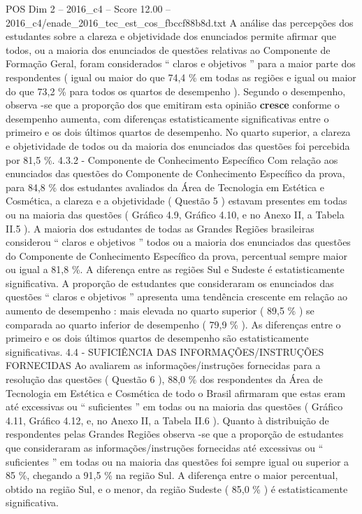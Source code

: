 \begin{textsample}{POS Dim 2 – 2016\_c4 – Score 12.00 – 2016\_c4/enade\_2016\_tec\_est\_cos\_fbccf88b8d.txt}
A análise das percepções dos estudantes sobre a clareza e objetividade dos enunciados permite afirmar que todos, ou a maioria dos enunciados de questões relativas ao Componente de Formação Geral, foram considerados “ claros e objetivos ” para a maior parte dos respondentes ( igual ou maior do que 74,4 \% em todas as regiões e igual ou maior do que 73,2 \% para todos os quartos de desempenho ).
Segundo o desempenho, observa -se que a proporção dos que emitiram esta opinião \textbf{cresce} conforme o desempenho aumenta, com diferenças estatisticamente significativas entre o primeiro e os dois últimos quartos de desempenho.
No quarto superior, a clareza e objetividade de todos ou da maioria dos enunciados das questões foi percebida por 81,5 \%. 4.3.2 - Componente de Conhecimento Específico Com relação aos enunciados das questões do Componente de Conhecimento Específico da prova, para 84,8 \% dos estudantes avaliados da Área de Tecnologia em Estética e Cosmética, a clareza e a objetividade ( Questão 5 ) estavam presentes em todas ou na maioria das questões ( Gráfico 4.9, Gráfico 4.10, e no Anexo II, a Tabela II.5 ).
A maioria dos estudantes de todas as Grandes Regiões brasileiras considerou “ claros e objetivos ” todos ou a maioria dos enunciados das questões do Componente de Conhecimento Específico da prova, percentual sempre maior ou igual a 81,8 \%.
A diferença entre as regiões Sul e Sudeste é estatisticamente significativa.
A proporção de estudantes que consideraram os enunciados das questões “ claros e objetivos ” apresenta uma tendência crescente em relação ao aumento de desempenho : mais elevada no quarto superior ( 89,5 \% ) se comparada ao quarto inferior de desempenho ( 79,9 \% ).
As diferenças entre o primeiro e os dois últimos quartos de desempenho são estatisticamente significativas. 4.4 - SUFICIÊNCIA DAS INFORMAÇÕES/INSTRUÇÕES FORNECIDAS Ao avaliarem as informações/instruções fornecidas para a resolução das questões ( Questão 6 ), 88,0 \% dos respondentes da Área de Tecnologia em Estética e Cosmética de todo o Brasil afirmaram que estas eram até excessivas ou “ suficientes ” em todas ou na maioria das questões ( Gráfico 4.11, Gráfico 4.12, e, no Anexo II, a Tabela II.6 ).
Quanto à distribuição de respondentes pelas Grandes Regiões observa -se que a proporção de estudantes que consideraram as informações/instruções fornecidas até excessivas ou “ suficientes ” em todas ou na maioria das questões foi sempre igual ou superior a 85 \%, chegando a 91,5 \% na região Sul.
A diferença entre o maior percentual, obtido na região Sul, e o menor, da região Sudeste ( 85,0 \% ) é estatisticamente significativa.

\end{textsample}
